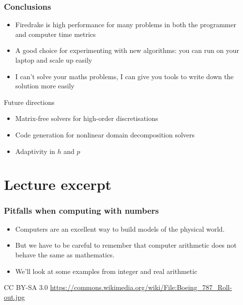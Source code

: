 \documentclass[presentation]{beamer}
\begin{document}
\begin{frame}
  \frametitle{Conclusions}
  \begin{itemize}
  \item Firedrake is high performance for many problems in both
    the programmer and computer time metrics
  \item A good choice for experimenting with new algorithms: you can
    run on your laptop and scale up easily
  \item I can't solve your maths problems, I can give you tools to
    write down the solution more easily
  \end{itemize}

  \begin{block}{Future directions}
    \begin{itemize}
    \item Matrix-free solvers for high-order discretisations
    \item Code generation for nonlinear domain decomposition solvers
    \item Adaptivity in $h$ and $p$
    \end{itemize}
  \end{block}
\end{frame}

\section{Lecture excerpt}

\begin{frame}[fragile]
  \frametitle{Pitfalls when computing with numbers}
  \begin{itemize}
  \item Computers are an excellent way to build models of the physical
    world.
  \item But we have to be careful to remember that computer arithmetic
    does not behave the same as mathematics.
  \item We'll look at some examples from integer and real arithmetic
  \end{itemize}
\end{frame}

\begin{frame}[plain,t]
  \begin{flushright}
      \tiny CC BY-SA 3.0
      \url{https://commons.wikimedia.org/wiki/File:Boeing_787_Roll-out.jpg}
  \end{flushright}
\end{frame}
\end{document}
